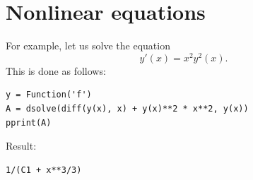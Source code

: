 \documentclass[article,A4,12pt]{llncs}
\begin{document}



\section{Nonlinear equations}

For example, let us solve the equation 
$$
  y'(x) = x^2 y^2(x).
$$
This is done as follows:
\begin{verbatim}
y = Function('f')
A = dsolve(diff(y(x), x) + y(x)**2 * x**2, y(x))
pprint(A)
\end{verbatim}
Result:
\begin{verbatim}
1/(C1 + x**3/3)
\end{verbatim}

\end{document}
